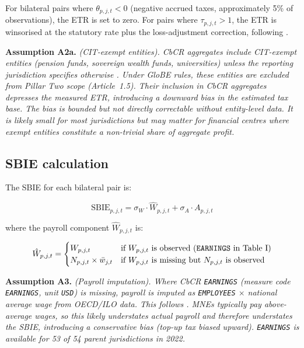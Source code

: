 \documentclass[11pt,a4paper]{article}
\newcommand{\code}[1]{\texttt{#1}}
\newcommand{\assumption}[2]{\noindent\textbf{Assumption #1.} \textit{#2}\medskip}
\begin{document}
For bilateral pairs where $\theta_{p,j,t} < 0$ (negative accrued taxes, approximately 5\% of observations), the ETR is set to zero. For pairs where $\tau_{p,j,t} > 1$, the ETR is winsorised at the statutory rate plus the loss-adjustment correction, following \citet{hugger2025}.

\assumption{A2a}{(CIT-exempt entities). CbCR aggregates include CIT-exempt entities (pension funds, sovereign wealth funds, universities) unless the reporting jurisdiction specifies otherwise \citep{oecd2025corptaxstats}. Under GloBE rules, these entities are excluded from Pillar Two scope (Article~1.5). Their inclusion in CbCR aggregates depresses the measured ETR, introducing a downward bias in the estimated tax base. The bias is bounded but not directly correctable without entity-level data. It is likely small for most jurisdictions but may matter for financial centres where exempt entities constitute a non-trivial share of aggregate profit.}

\subsection{SBIE calculation}\label{sec:sbie_calc}

The SBIE for each bilateral pair is:

\begin{equation}\label{eq:sbie}
\text{SBIE}_{p,j,t} = \sigma_W \cdot \hat{W}_{p,j,t} + \sigma_A \cdot A_{p,j,t}
\end{equation}

where the payroll component $\hat{W}_{p,j,t}$ is:

\begin{equation}\label{eq:payroll}
\hat{W}_{p,j,t} = \begin{cases}
W_{p,j,t} & \text{if } W_{p,j,t} \text{ is observed (\code{EARNINGS} in Table~I)} \\
N_{p,j,t} \times \bar{w}_{j,t} & \text{if } W_{p,j,t} \text{ is missing but } N_{p,j,t} \text{ is observed}
\end{cases}
\end{equation}

\assumption{A3}{(Payroll imputation). Where CbCR \code{EARNINGS} (measure code \code{EARNINGS}, unit \code{USD}) is missing, payroll is imputed as \code{EMPLOYEES} $\times$ national average wage from OECD/ILO data. This follows \citet{barake2022}. MNEs typically pay above-average wages, so this likely \emph{understates} actual payroll and therefore understates the SBIE, introducing a conservative bias (top-up tax biased upward). \code{EARNINGS} is available for 53 of 54 parent jurisdictions in 2022.}
\end{document}
